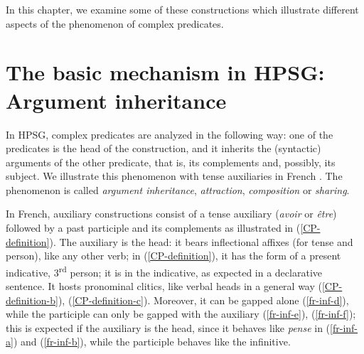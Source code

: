 \documentclass[output=paper]{langsci/langscibook}
\begin{document}
In this chapter, we examine some of these constructions which illustrate different aspects of the phenomenon of complex predicates.

\section{The basic mechanism in HPSG: Argument inheritance}

In HPSG, complex predicates are analyzed in the following way: one of the predicates is the head of the construction, and it inherits the (syntactic) arguments of the other predicate, that is, its complements and, possibly, its subject. We illustrate this phenomenon with tense auxiliaries in French \citep{AG2002b-u}. The phenomenon is called \textit{argument inheritance}, \textit{attraction}, \textit{composition} or \textit{sharing}.

In French, auxiliary constructions consist of a tense auxiliary (\textit{avoir} or \textit{\^etre}) followed by a past participle and its complements as illustrated in (\ref{CP-definition}). The auxiliary is the head: it bears inflectional affixes (for tense and person), like any other verb; in (\ref{CP-definition}), it has the form of a present indicative, 3\textsuperscript{rd} person; it is in the indicative, as expected in a declarative sentence. It hosts pronominal clitics, like verbal heads in a general way (\ref{CP-definition-b}), (\ref{CP-definition-c}). Moreover, it can be gapped alone (\ref{fr-inf-d}), while the participle can only be gapped with the auxiliary (\ref{fr-inf-e}), (\ref{fr-inf-f}); this is expected if the auxiliary is the head, since it behaves like \textit{pense}  in (\ref{fr-inf-a}) and (\ref{fr-inf-b}), while the participle behaves like the infinitive. 
\end{document}
